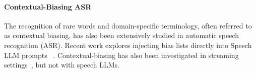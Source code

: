\paragraph{Contextual-Biasing ASR}
The recognition of rare words and domain-specific terminology, often referred to as contextual biasing, has also been extensively studied in automatic speech recognition (ASR). Recent work explores injecting bias lists directly into Speech LLM prompts ~\citep{10446898,gong25_interspeech}. Contextual-biasing has also been investigated in streaming settings~\citep{xu23d_interspeech}, but not with speech LLMs. 